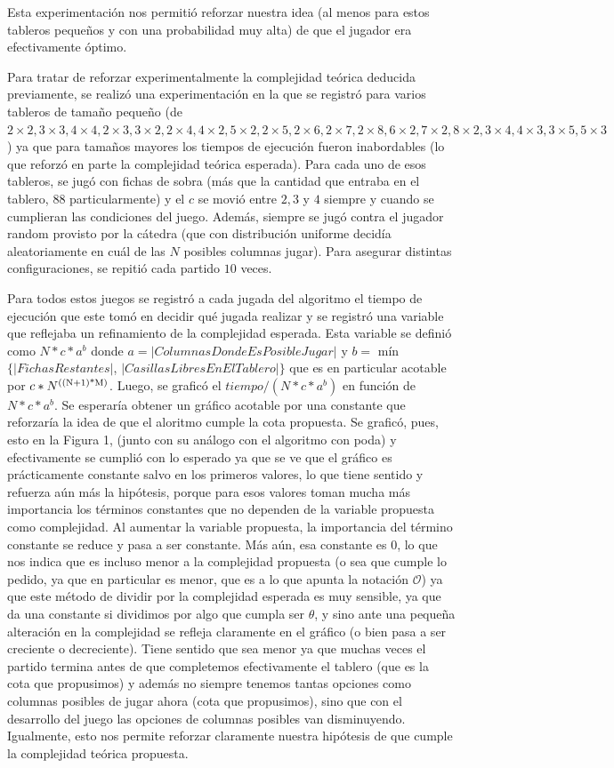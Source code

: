 \documentclass[A4paper,oneside,fleqn,11pt]{article}
\theoremstyle{definition}
\begin{document}
Esta experimentación nos permitió reforzar nuestra idea (al menos para estos tableros pequeños y con una probabilidad muy alta) de que el jugador era efectivamente óptimo.

Para tratar de reforzar experimentalmente la complejidad teórica deducida previamente, se realizó una experimentación en la que se registró para varios tableros de tamaño pequeño (de $2\times2, 3\times3, 4\times4, 2\times3, 3\times2, 2\times4, 4\times2, 5\times2, 2\times5, 2\times6, 2\times7, 2\times8, 6\times2, 7\times2, 8\times2, 3\times4, 4\times3, 3\times5, 5\times3$) ya que para tamaños mayores los tiempos de ejecución fueron inabordables (lo que reforzó en parte la complejidad teórica esperada). Para cada uno de esos tableros, se jugó con fichas de sobra (más que la cantidad que entraba en el tablero, 88 particularmente) y el $c$ se movió entre $2, 3$ y $4$ siempre y cuando se cumplieran las condiciones del juego. Además, siempre se jugó contra el jugador random provisto por la cátedra (que con distribución uniforme decidía aleatoriamente en cuál de las $N$ posibles columnas jugar). Para asegurar distintas configuraciones, se repitió cada partido $10$ veces. 


Para todos estos juegos se registró a cada jugada del algoritmo el tiempo de ejecución que este tomó en decidir qué jugada realizar y se registró una variable que reflejaba un refinamiento de la complejidad esperada. Esta variable se definió como $N*c*a^b$ donde $a=|Columnas Donde Es Posible Jugar|$ y $b =$ mín$\{|FichasRestantes|$, $|Casillas Libres En El Tablero|\}$ que es en particular acotable por $c*N\textsuperscript{((N+1)*M)}$. Luego, se graficó el $tiempo/(N*c*a^b)$ en función de $N*c*a^b$. Se esperaría obtener un gráfico acotable por una constante que reforzaría la idea de que el aloritmo cumple la cota propuesta. Se graficó, pues, esto en la Figura 1, (junto con su análogo con el algoritmo con poda) y efectivamente se cumplió con lo esperado ya que se ve que el gráfico es prácticamente constante salvo en los primeros valores, lo que tiene sentido y refuerza aún más la hipótesis, porque para esos valores toman mucha más importancia los términos constantes que no dependen de la variable propuesta como complejidad. Al aumentar la variable propuesta, la importancia del término constante se reduce y pasa a ser constante. Más aún, esa constante es $0$, lo que nos indica que es incluso menor a la complejidad propuesta (o sea que cumple lo pedido, ya que en particular es menor, que es a lo que apunta la notación $\mathcal{O}$) ya que este método de dividir por la complejidad esperada es muy sensible, ya que da una constante si dividimos por algo que cumpla ser $\mathcal{\theta}$, y sino ante una pequeña alteración en la complejidad se refleja claramente en el gráfico (o bien pasa a ser creciente o decreciente). Tiene sentido que sea menor ya que muchas veces el partido termina antes de que completemos efectivamente el tablero (que es la cota que propusimos) y además no siempre tenemos tantas opciones como columnas posibles de jugar ahora (cota que propusimos), sino que con el desarrollo del juego las opciones de columnas posibles van disminuyendo. Igualmente, esto nos permite reforzar claramente nuestra hipótesis de que cumple la complejidad teórica propuesta.
\end{document}
